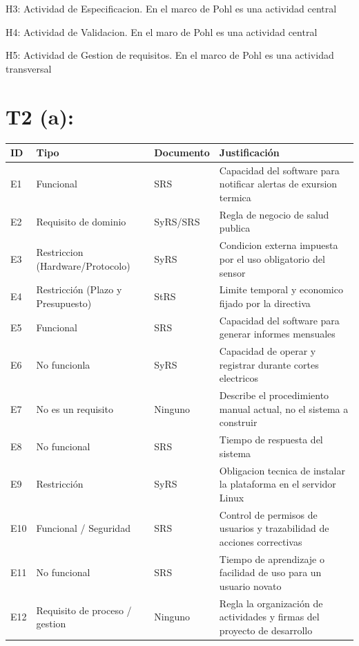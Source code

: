 \documentclass[11pt,a4paper]{article}
\begin{document}
H3: Actividad de Especificacion. En el marco de Pohl es una actividad central

H4: Actividad de Validacion. En el maro de Pohl es una actividad central

H5: Actividad de Gestion de requisitos. En el marco de Pohl es una actividad transversal

\section*{T2 (a):}

\begin{table}[H]
\centering
\renewcommand{\arraystretch}{1.35}
\begin{tabularx}{\textwidth}{|l|l|l|X|}
\hline
\textbf{ID} & \textbf{Tipo} & \textbf{Documento} & \textbf{Justificación} \\ \hline
E1 & Funcional & SRS & Capacidad del software para notificar alertas de exursion termica \\ \hline
E2 & Requisito de dominio & SyRS/SRS & Regla de negocio de salud publica \\ \hline
E3 & Restriccion (Hardware/Protocolo) & SyRS & Condicion externa impuesta por el uso obligatorio del sensor \\ \hline
E4 & Restricción (Plazo y Presupuesto) & StRS & Limite temporal y economico fijado por la directiva \\ \hline
E5 & Funcional & SRS & Capacidad del software para generar informes mensuales \\ \hline
E6 & No funcionla & SyRS & Capacidad de operar y registrar durante cortes electricos \\ \hline
E7 & No es un requisito & Ninguno & Describe el procedimiento manual actual, no el sistema a construir \\ \hline
E8 & No funcional & SRS & Tiempo de respuesta del sistema \\ \hline
E9 & Restricción & SyRS & Obligacion tecnica de instalar la plataforma en el servidor Linux \\ \hline
E10 & Funcional / Seguridad & SRS & Control de permisos de usuarios y trazabilidad de acciones correctivas \\ \hline
E11 & No funcional & SRS & Tiempo de aprendizaje o facilidad de uso para un usuario novato \\ \hline
E12 & Requisito de proceso / gestion & Ninguno & Regla la organización de actividades y firmas del proyecto de desarrollo \\ \hline
\end{tabularx}
\end{table}
\end{document}
